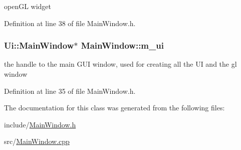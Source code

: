 openGL widget 



Definition at line 38 of file MainWindow.h.

\hypertarget{class_main_window_a5a3eb262660797d9a4d52ed16edb6d11}{
\subsubsection[{m\_\-ui}]{\setlength{\rightskip}{0pt plus 5cm}Ui::MainWindow$\ast$ {\bf MainWindow::m\_\-ui}}}
\label{class_main_window_a5a3eb262660797d9a4d52ed16edb6d11}


the handle to the main GUI window, used for creating all the UI and the gl window 



Definition at line 35 of file MainWindow.h.



The documentation for this class was generated from the following files:\begin{DoxyCompactItemize}
\item 
include/\hyperlink{_main_window_8h}{MainWindow.h}\item 
src/\hyperlink{_main_window_8cpp}{MainWindow.cpp}\end{DoxyCompactItemize}
